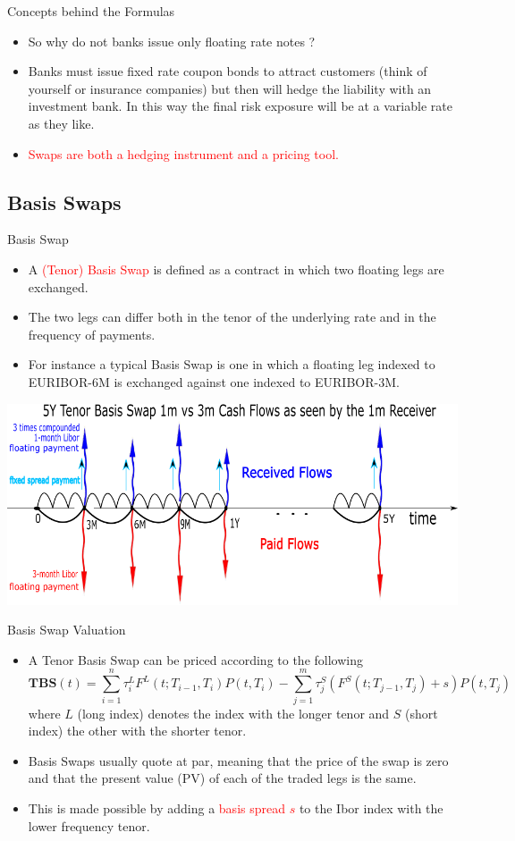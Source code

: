 \documentclass{beamer}
\begin{document}
\begin{frame}{Concepts behind the Formulas}
	\begin{itemize}
		\item<1-> So why do not banks issue only floating rate notes ?
		\item<2-> Banks must issue fixed rate coupon bonds to attract customers (think of yourself or insurance companies) but then will hedge the liability  with an investment bank. In this way the final risk exposure will be at a variable rate as they like. 
		\item<3-> \textcolor{red}{Swaps are both a hedging instrument and a pricing tool.}
	\end{itemize}
\end{frame}

\subsection{Basis Swaps}
\begin{frame}{Basis Swap}
	\begin{itemize}
	\item A \textcolor{red}{(Tenor) Basis Swap} is defined as a contract in which two floating legs are exchanged.
	\item The two legs can differ both in the tenor of the underlying rate and in the frequency of payments.
	\item For instance a typical Basis Swap is one in which a floating leg indexed to EURIBOR-6M is exchanged against one indexed to EURIBOR-3M.
	\end{itemize}
	\begin{center}
		\includegraphics[width=0.5\linewidth]{tenor_basis_swap}
	\end{center}
\end{frame}

\begin{frame}{Basis Swap Valuation}
\begin{itemize}
	\item<1-> A Tenor Basis Swap can be priced according to the following
	\begin{equation}
	\textbf{TBS}(t) = \sum_{i=1}^n \tau_i^{L} F^{L}(t;T_{i-1},T_i)P(t,T_i) - \sum_{j=1}^m \tau_j^{S} (F^{S}(t;T_{j-1},T_j)+s)P(t,T_j)
	\end{equation}
	where $L$ (long index) denotes the index with the longer tenor and $S$ (short index) the other with the shorter tenor.
	\item<2-> Basis Swaps usually quote at par, meaning that the price of the swap is zero and that the present value (PV) of each of the traded legs is the same. 
	\item<3-> This is made possible by adding a \textcolor{red}{basis spread $s$} to the Ibor index with the lower frequency tenor.
	\end{itemize}
\end{frame}
\end{document}

